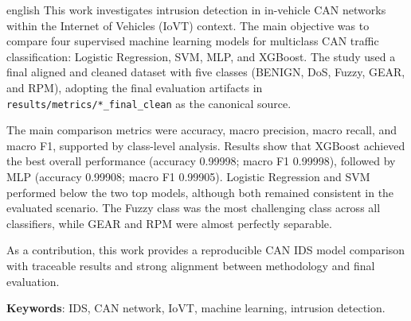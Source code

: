 \begin{resumo}[Abstract]
 \begin{otherlanguage*}{english}
This work investigates intrusion detection in in-vehicle CAN networks within the Internet of Vehicles (IoVT) context. The main objective was to compare four supervised machine learning models for multiclass CAN traffic classification: Logistic Regression, SVM, MLP, and XGBoost. The study used a final aligned and cleaned dataset with five classes (BENIGN, DoS, Fuzzy, GEAR, and RPM), adopting the final evaluation artifacts in \texttt{results/metrics/*\_final\_clean} as the canonical source.

The main comparison metrics were accuracy, macro precision, macro recall, and macro F1, supported by class-level analysis. Results show that XGBoost achieved the best overall performance (accuracy 0.99998; macro F1 0.99998), followed by MLP (accuracy 0.99908; macro F1 0.99905). Logistic Regression and SVM performed below the two top models, although both remained consistent in the evaluated scenario. The Fuzzy class was the most challenging class across all classifiers, while GEAR and RPM were almost perfectly separable.

As a contribution, this work provides a reproducible CAN IDS model comparison with traceable results and strong alignment between methodology and final evaluation.
   \vspace{\onelineskip}
 
   \noindent 
  \textbf{Keywords}: IDS, CAN network, IoVT, machine learning, intrusion detection.
 \end{otherlanguage*}
\end{resumo}

% 
%
%  
